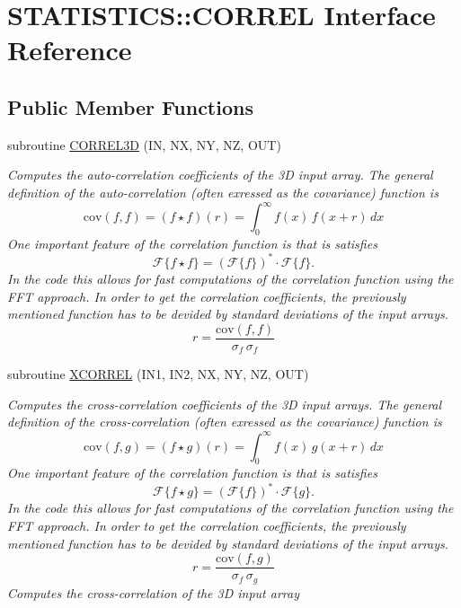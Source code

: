 \hypertarget{interfaceSTATISTICS_1_1CORREL}{
\section{STATISTICS::CORREL Interface Reference}
\label{interfaceSTATISTICS_1_1CORREL}
}
\subsection*{Public Member Functions}
\begin{DoxyCompactItemize}
\item 
subroutine \hyperlink{interfaceSTATISTICS_1_1CORREL_a206eb4c97224194622bc1108e5a541fa}{CORREL3D} (IN, NX, NY, NZ, OUT)
\begin{DoxyCompactList}\small\item\em Computes the auto-\/correlation coefficients of the 3D input array. The general definition of the auto-\/correlation (often exressed as the covariance) function is \[\mathrm{cov}(f,f)=\left(f\star f\right)(r)=\int_0^{\infty}f(x)\,f(x+r)\,dx \] One important feature of the correlation function is that is satisfies \[\mathcal{F}\{f\star f\}=(\mathcal{F}\{f\})^*\cdot\mathcal{F}\{f\}. \] In the code this allows for fast computations of the correlation function using the FFT approach. In order to get the correlation coefficients, the previously mentioned function has to be devided by standard deviations of the input arrays. \[r=\frac{\mathrm{cov}(f,f)}{\sigma_f\,\sigma_f} \] \end{DoxyCompactList}\item 
subroutine \hyperlink{interfaceSTATISTICS_1_1CORREL_aebc01ee1d1300e0d47d6984308594343}{XCORREL} (IN1, IN2, NX, NY, NZ, OUT)
\begin{DoxyCompactList}\small\item\em Computes the cross-\/correlation coefficients of the 3D input arrays. The general definition of the cross-\/correlation (often exressed as the covariance) function is \[\mathrm{cov}(f,g)=\left(f\star g\right)(r)=\int_0^{\infty}f(x)\,g(x+r)\,dx \] One important feature of the correlation function is that is satisfies \[\mathcal{F}\{f\star g\}=(\mathcal{F}\{f\})^*\cdot\mathcal{F}\{g\}. \] In the code this allows for fast computations of the correlation function using the FFT approach. In order to get the correlation coefficients, the previously mentioned function has to be devided by standard deviations of the input arrays. \[r=\frac{\mathrm{cov}(f,g)}{\sigma_f\,\sigma_g} \] Computes the cross-\/correlation of the 3D input array \end{DoxyCompactList}\end{DoxyCompactItemize}


